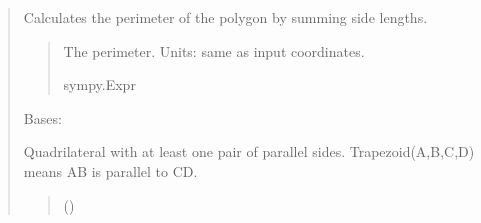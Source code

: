 \documentclass[letterpaper,10pt,english]{sphinxmanual}
\begin{document}
\begin{quote}
\begin{fulllineitems}

\begin{fulllineitems}
\label{\detokenize{pygeox:pygeox.custom_objects.Square.perimeter}}
\pysigstartsignatures
\pysigline
{}
\pysigstopsignatures
\sphinxAtStartPar
Calculates the perimeter of the polygon by summing side lengths.
\begin{quote}\begin{description}
\sphinxAtStartPar
The perimeter. Units: same as input coordinates.

\sphinxAtStartPar
sympy.Expr

\end{description}\end{quote}

\end{fulllineitems}


\end{fulllineitems}


\begin{fulllineitems}
\label{\detokenize{pygeox:pygeox.custom_objects.Trapezoid}}
\pysigstartsignatures
\pysiglinewithargsret
{}
{\sphinxparamcomma {}\sphinxparamcomma {}\sphinxparamcomma {}\sphinxparamcomma {}\sphinxparamcomma {}\sphinxparamcomma {}\sphinxparamcomma {}}
{}
\pysigstopsignatures
\sphinxAtStartPar
Bases: 

\sphinxAtStartPar
Quadrilateral with at least one pair of parallel sides. Trapezoid(A,B,C,D) means AB is parallel to CD.
\begin{quote}\begin{description}
\sphinxAtStartPar
{} ()


\end{description}
\end{quote}
\end{fulllineitems}
\end{quote}
\end{document}
